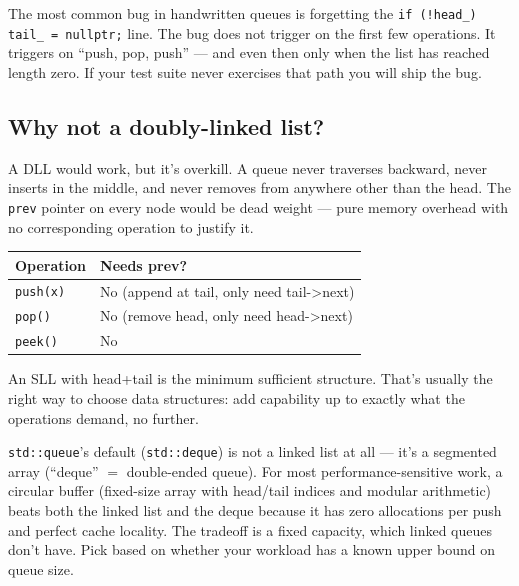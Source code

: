 \documentclass[11pt]{article}
\begin{document}
\begin{warnbox}
The most common bug in handwritten queues is forgetting the
\texttt{if (!head\_) tail\_ = nullptr;} line. The bug does not
trigger on the first few operations. It triggers on ``push, pop,
push'' --- and even then only when the list has reached length
zero. If your test suite never exercises that path you will ship
the bug.
\end{warnbox}

\subsection*{Why not a doubly-linked list?}

A DLL would work, but it's overkill. A queue never traverses
backward, never inserts in the middle, and never removes from
anywhere other than the head. The \texttt{prev} pointer on every
node would be dead weight --- pure memory overhead with no
corresponding operation to justify it.

\begin{center}
\begin{tabular}{|l|l|}
\hline
\textbf{Operation} & \textbf{Needs prev?} \\
\hline
\texttt{push(x)}   & No (append at tail, only need tail->next) \\
\texttt{pop()}     & No (remove head, only need head->next) \\
\texttt{peek()}    & No \\
\hline
\end{tabular}
\end{center}

An SLL with head+tail is the minimum sufficient structure. That's
usually the right way to choose data structures: add capability
up to exactly what the operations demand, no further.

\begin{notebox}
\texttt{std::queue}'s default (\texttt{std::deque}) is not a
linked list at all --- it's a segmented array (``deque'' $=$
double-ended queue). For most performance-sensitive work, a
circular buffer (fixed-size array with head/tail indices and
modular arithmetic) beats both the linked list and the deque
because it has zero allocations per push and perfect cache
locality. The tradeoff is a fixed capacity, which linked queues
don't have. Pick based on whether your workload has a known upper
bound on queue size.
\end{notebox}
\end{document}
